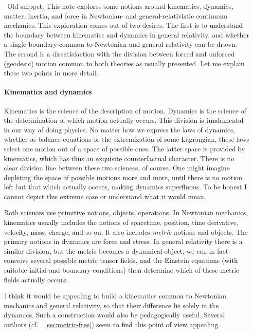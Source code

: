 \documentclass[\ifafour a4paper,12pt,\else a5paper,10pt,\fi%
onecolumn,oneside,article,%
british%
]{memoir}
\theoremstyle{remark}
\theoremstyle{innote}
\renewcommand*{\|}[1][]{\nonscript\,#1\vert\nonscript\;\mathopen{}}
\newcommand*{\cf}{{cf.}}
\newcommand*{\puzzle}{{\fontencoding{U}\fontfamily{fontawesometwo}\selectfont\symbol{225}}}
\newcommand*{\wrench}{{\fontencoding{U}\fontfamily{fontawesomethree}\selectfont\symbol{114}}}
\newcommand{\mynote}[1]{ {\color{notecolour}\wrench\ #1}}
\newcommand*{\psect}{{\footnotesize\puzzle}}%
\begin{document}
\mynote{Old snippet:} This note explores some notions around kinematics,
dynamics, matter, inertia, and force in Newtonian- and general-relativistic
continuum mechanics. This exploration comes out of two desires. The first
is to understand the boundary between kinematics and dynamics in general
relativity, and whether a single boundary common to Newtonian and general
relativity can be drawn. The second is a dissatisfaction with the division
between forced and unforced (geodesic) motion common to both theories as
usually presented. Let me explain these two points in more detail.

\paragraph{Kinematics and dynamics}

Kinematics is the science of the description of motion. Dynamics is the
science of the determination of which motion actually occurs. This division
is fundamental in our way of doing physics. No matter how we express the
laws of dynamics, whether as balance equations or the extremization of some
Lagrangian, these laws select one motion out of a space of possible ones.
The latter space is provided by kinematics, which has thus an exquisite
counterfactual character. There is no clear division line between these two
sciences, of course. One might imagine depleting the space of possible
motions more and more, until there is no motion left but that which
actually occurs, making dynamics superfluous. To be honest I cannot depict
this extreme case or understand what it would mean.

Both sciences use primitive notions, objects, operations. In Newtonian
mechanics, kinematics usually includes the notions of spacetime, position,
time derivative, velocity, mass, charge, and so on. It also includes
\emph{metric} notions and objects. The primary notions in dynamics are
force and stress. In general relativity there is a similar division, but
the metric becomes a dynamical object; we can in fact conceive several
possible metric tensor fields, and the Einstein equations (with suitable
initial and boundary conditions) then determine which of these metric
fields actually occurs.

I think it would be appealing to build a kinematics common to Newtonian
mechanics and general relativity, so that their difference lie solely in
the dynamics. Such a construction would also be pedagogically useful.
Several authors (\cf\ \psect~\ref{sec:metric-free}) seem to find this point
of view appealing.
\end{document}

